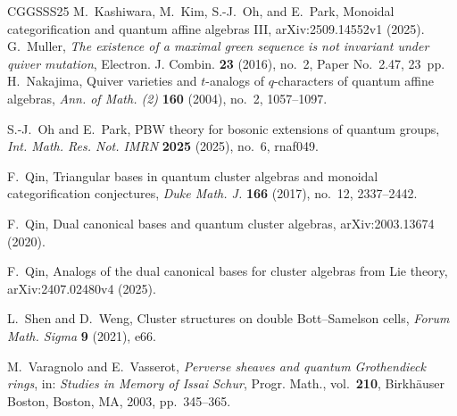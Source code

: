 \documentclass[12pt, reqno]{amsart}
\theoremstyle{plain}
\theoremstyle{definition}
\numberwithin{equation}{section}
\begin{document}
\begin{thebibliography}{CGGSSS25}
M.~Kashiwara, M.~Kim, S.-J.~Oh, and E.~Park,
\newblock Monoidal categorification and quantum affine algebras III,
\newblock arXiv:2509.14552v1 (2025).
G.~Muller,
\emph{The existence of a maximal green sequence is not invariant
under quiver mutation},
Electron. J. Combin. \textbf{23} (2016), no.~2,
Paper No.~2.47, 23~pp.
H.~Nakajima,
\newblock Quiver varieties and \(t\)-analogs of \(q\)-characters of
quantum affine algebras,
\newblock \emph{Ann. of Math. (2)} \textbf{160} (2004), no.~2,
1057--1097.

S.-J.~Oh and E.~Park,
\newblock PBW theory for bosonic extensions of quantum groups,
\newblock \emph{Int. Math. Res. Not. IMRN} \textbf{2025} (2025),
no.~6, rnaf049.

F.~Qin,
\newblock Triangular bases in quantum cluster algebras and monoidal
categorification conjectures,
\newblock \emph{Duke Math. J.} \textbf{166} (2017), no.~12, 2337--2442.

F.~Qin,
\newblock Dual canonical bases and quantum cluster algebras,
\newblock arXiv:2003.13674 (2020).

F.~Qin,
\newblock Analogs of the dual canonical bases for cluster algebras
from Lie theory,
\newblock arXiv:2407.02480v4 (2025).

L.~Shen and D.~Weng,
\newblock Cluster structures on double Bott--Samelson cells,
\newblock \emph{Forum Math. Sigma} \textbf{9} (2021), e66.

M.~Varagnolo and E.~Vasserot,
\emph{Perverse sheaves and quantum Grothendieck rings},
in: \emph{Studies in Memory of Issai Schur},
Progr. Math., vol.~\textbf{210},
Birkh\"auser Boston, Boston, MA, 2003, pp.~345--365.

\end{thebibliography}
\end{document}
